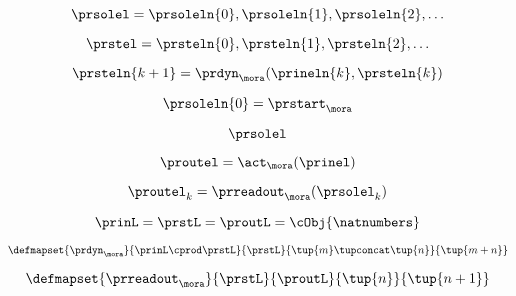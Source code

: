 \begin{forslides}
    \begin{equation}
        \label{eq:slides-processes-06}
        \prsolel = \prsoleln{0}, \prsoleln{1}, \prsoleln{2}, \ldots
    \end{equation}

    \begin{equation}
        \label{eq:slides-processes-06b}
        \prstel = \prsteln{0}, \prsteln{1}, \prsteln{2}, \ldots
    \end{equation}

    \begin{equation}
        \label{eq:slides-processes-07}
        \prsteln{k+1} = \prdyn_\mora(\prineln{k}, \prsteln{k})
    \end{equation}

    \begin{equation}
        \label{eq:slides-processes-07b}
        \prsoleln{0} = \prstart_\mora
    \end{equation}

    \begin{equation}
        \label{eq:slides-processes-08}
        \prsolel
    \end{equation}

    \begin{equation}
        \label{eq:slides-processes-09}
        \proutel = \act_{\mora}(\prinel)
    \end{equation}

    \begin{equation}
        \label{eq:slides-processes-10}
        \proutel_k =  \prreadout_\mora(\prsolel_k)
    \end{equation}

    \begin{equation}
        \label{eq:slides-processes-11}
        \prinL = \prstL = \proutL = \cObj{\natnumbers}
    \end{equation}

    \begin{equation}
        \label{eq:slides-processes-12}
        \defmapset{
            \prdyn_\mora
        }{
            \prinL \cprod \prstL
        }{
            \prstL
        }{
            \tup{m} \tupconcat \tup{n}
        }{
            \tup{m + n}
        }
    \end{equation}

    \begin{equation}
        \label{eq:slides-processes-13}
        \defmapset{
            \prreadout_\mora
        }{
            \prstL
        }{
            \proutL
        }{
            \tup{n}
        }{
            \tup{n+1}
        }
    \end{equation}


\end{forslides}
